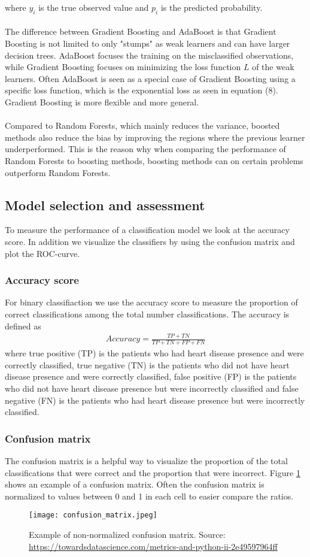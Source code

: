 \documentclass[a4paper,twocolumn]{article}
\begin{document}
where $y_{i}$ is the true observed value and $p_{i}$ is the predicted probability.\\
\\
The difference between Gradient Boosting and AdaBoost is that Gradient Boosting is not limited to only "stumps" as weak learners and can have larger decision trees. AdaBoost focuses the training on the misclassified observations, while Gradient Boosting focuses on minimizing the loss function $L$ of the weak learners. Often AdaBoost is seen as a special case of Gradient Boosting using a specific loss function, which is the exponential loss as seen in equation (8). Gradient Boosting is more flexible and more general.\\
\\
Compared to Random Forests, which mainly reduces the variance\cite[p.~588]{hastie}, boosted methods also reduce the bias by improving the regions where the previous learner underperformed. This is the reason why when comparing the performance of Random Forests to boosting methods, boosting methods can on certain problems outperform Random Forests.
\subsection{Model selection and assessment}
To measure the performance of a classification model we look at the accuracy score. In addition we visualize the classifiers by using the confusion matrix and plot the ROC-curve. 
\subsubsection{Accuracy score}
For binary classifiaction we use the accuracy score to measure the proportion of correct classifications among the total number classifications. The accuracy is defined as
\begin{align}
    Accuracy = \frac{TP + TN}{TP + TN + FP + FN}
\end{align}
where true positive (TP) is the patients who had heart disease presence and were correctly classified, true negative (TN) is the patients who did not have heart disease presence and were correctly classified, false positive (FP) is the patients who did not have heart disease presence but were incorrectly classified and false negative (FN) is the patients who had heart disease presence but were incorrectly classified.
\subsubsection{Confusion matrix}
The confusion matrix is a helpful way to visualize the proportion of the total classifications that were correct and the proportion that were incorrect. Figure \ref{fig:3} shows an example of a confusion matrix. Often the confusion matrix is normalized to values between 0 and 1 in each cell to easier compare the ratios.
\begin{figure}[ht]
    \centering
    \texttt{[image: confusion\_matrix.jpeg]}
    \caption{Example of non-normalized confusion matrix. Source: \href{https://towardsdatascience.com/metrics-and-python-ii-2e49597964ff}{https://towardsdatascience.com/metrics-and-python-ii-2e49597964ff}}
    \label{fig:3}
\end{figure}
\end{document}
